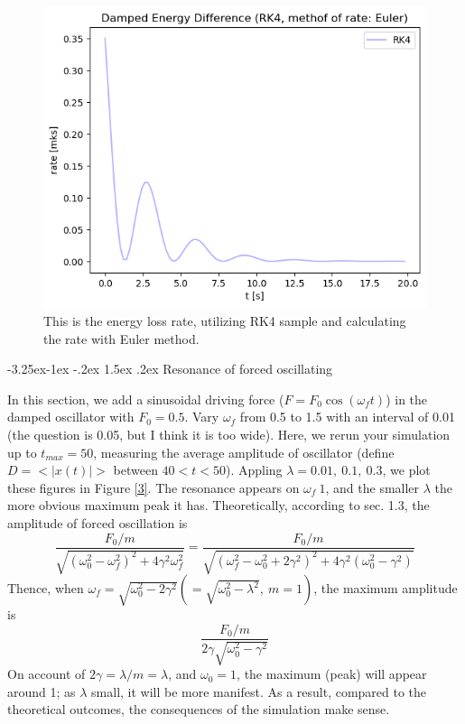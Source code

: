 \documentclass[12pt]{article}
\makeatletter
\renewcommand\subsection{\leftskip 0pt\@startsection{subsection}{2}{\z@}%
                                      {-3.25ex\@plus -1ex \@minus -.2ex}%
                                      {1.5ex \@plus .2ex}%
                                      {\normalfont\large\bfseries}}
\makeatother
\begin{document}
  \begin{figure}[H]
    \centering 
    \includegraphics[width = 12cm]{damped_a_rate.png}
    \caption{This is the energy loss rate, utilizing RK4 sample and calculating the rate with Euler method.}
    \label{3.a.2}
  \end{figure}
    
  \subsection{Resonance of forced oscillating}

  In this section, we add a sinusoidal driving force ($F = F_{0} \cos(\omega_{f} t)$) in the damped oscillator with $F_{0} = 0.5$. Vary $\omega_{f}$ from 0.5 to 1.5 with an interval of 0.01 (the question is 0.05, but I think it is too wide). Here, we rerun your simulation up to $t_{max} = 50$, measuring the average amplitude of  oscillator (define $D=<|x(t)|>$ between $40<t<50$). Appling $\lambda = 0.01,\ 0.1,\ 0.3$, we plot these figures in Figure \ref{3}. The resonance appears on $\omega_{f} ~ 1$, and the smaller $\lambda$ the more obvious maximum peak it has.
  \newline
  Theoretically, according to sec. 1.3, the amplitude of forced oscillation is 
  \[\frac{F_{0} / m}{\sqrt{(\omega_0^{2} - \omega_{f}^{2})^{2} + 4\gamma^{2}\omega_{f}^{2}}} = \frac{F_{0} / m}{\sqrt{(\omega_{f}^{2} - \omega_{0}^{2} + 2\gamma^{2})^{2} + 4 \gamma^{2}(\omega_{0}^{2}-\gamma^{2})}}\]
  Thence, when $\omega_{f} = \sqrt{\omega_{0}^{2} - 2 \gamma^{2}} (= \sqrt{\omega_{0}^{2} - \lambda^{2}},\ m = 1)$, the maximum amplitude is 
  \[\frac{F_{0} / m}{2\gamma \sqrt{\omega_{0}^{2} - \gamma^{2}}}\]
  On account of $2\gamma = \lambda / m = \lambda$, and $\omega_{0} = 1$, the maximum (peak) will appear around 1; as $\lambda$ small, it will be more manifest. As a result, compared to the theoretical outcomes, the consequences of the simulation make sense.
\end{document}
